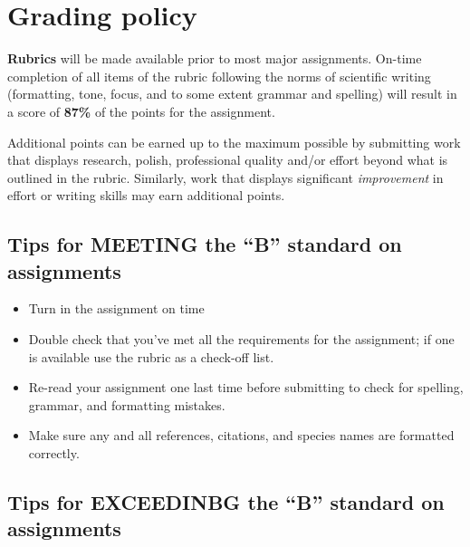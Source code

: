 \documentclass[
]{book}
\providecommand{\tightlist}{%
  \setlength{\itemsep}{0pt}\setlength{\parskip}{0pt}}
\begin{document}
\hypertarget{grading-policy}{%
\chapter{Grading policy}\label{grading-policy}}

\textbf{Rubrics} will be made available prior to most major assignments. On-time completion of all items of the rubric following the norms of scientific writing (formatting, tone, focus, and to some extent grammar and spelling) will result in a score of \textbf{87\%} of the points for the assignment.

Additional points can be earned up to the maximum possible by submitting work that displays research, polish, professional quality and/or effort beyond what is outlined in the rubric. Similarly, work that displays significant \emph{improvement} in effort or writing skills may earn additional points.

\hypertarget{tips-for-meeting-the-b-standard-on-assignments}{%
\section{Tips for MEETING the ``B'' standard on assignments}\label{tips-for-meeting-the-b-standard-on-assignments}}

\begin{itemize}
\tightlist
\item
  Turn in the assignment on time
\item
  Double check that you've met all the requirements for the assignment; if one is available use the rubric as a check-off list.
\item
  Re-read your assignment one last time before submitting to check for spelling, grammar, and formatting mistakes.
\item
  Make sure any and all references, citations, and species names are formatted correctly.
\end{itemize}

\hypertarget{tips-for-exceedinbg-the-b-standard-on-assignments}{%
\section{Tips for EXCEEDINBG the ``B'' standard on assignments}\label{tips-for-exceedinbg-the-b-standard-on-assignments}}
\end{document}
